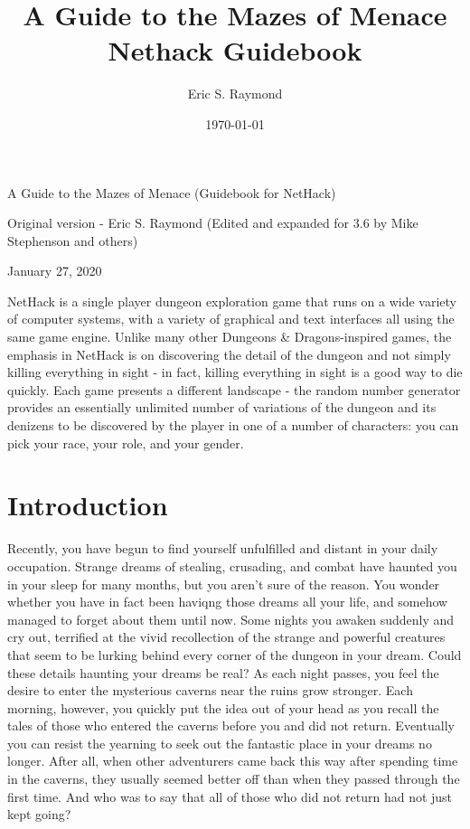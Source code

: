\documentclass[11pt]{article}
\author{Eric S. Raymond}
\date{\today}
\title{A Guide to the Mazes of Menace\\\medskip
\large Nethack Guidebook}
\begin{document}
\maketitle
\setcounter{tocdepth}{2}
\tableofcontents

\begin{center}
A Guide to the Mazes of Menace
   (Guidebook for NetHack)


	     Original version - Eric S. Raymond
(Edited and expanded for 3.6 by Mike Stephenson and others)

January 27, 2020
\end{center}

NetHack is a single player dungeon exploration game that runs on a
wide variety of computer systems, with a variety of graphical and text
interfaces all using the same game engine. Unlike many other Dungeons
\& Dragons-inspired games, the emphasis in NetHack is on discovering
the detail of the dungeon and not simply killing everything in sight -
in fact, killing everything in sight is a good way to die
quickly. Each game presents a different landscape - the random number
generator provides an essentially unlimited number of variations of
the dungeon and its denizens to be discovered by the player in one of
a number of characters: you can pick your race, your role, and your
gender. 



\section{Introduction}
\label{sec:org0e0a819}

Recently, you have begun to find yourself unfulfilled and distant in
your daily occupation.  Strange dreams of stealing, crusading, and
combat have haunted you in your sleep for many months, but you aren't
sure of the reason.  You wonder whether you have in fact been haviqng
those dreams all your life, and somehow managed to forget about them
until now.  Some nights you awaken suddenly and cry out, terrified at
the vivid recollection of the strange and powerful creatures that seem
to be lurking behind every corner of the dungeon in your dream.  Could
these details haunting your dreams be real?  As each night passes, you
feel the desire to enter the mysterious caverns near the ruins grow
stronger.  Each morning, however, you quickly put the idea out of your
head as you recall the tales of those who entered the caverns before
you and did not return.  Eventually you can resist the yearning to
seek out the fantastic place in your dreams no longer.  After all,
when other adventurers came back this way after spending time in the
caverns, they usually seemed better off than when they passed through
the first time.  And who was to say that all of those who did not
return had not just kept going?
\end{document}

